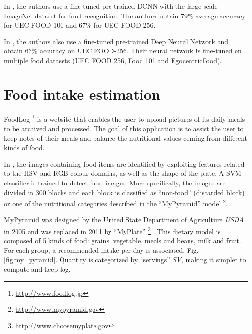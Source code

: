 
In \cite{Yanai2015}, the authors use a fine-tuned pre-trained DCNN with the large-scale ImageNet dataset for food recognition. The authors obtain 79\% average accuracy for UEC FOOD 100 and 67\% for UEC FOOD-256.

In \cite{Bolanos2016}, the authors also use a fine-tuned pre-trained Deep Neural Network and obtain 63\% accuracy on UEC FOOD-256. Their neural network is fine-tuned on multiple food datasets (UEC FOOD 256, Food 101 and EgocentricFood).

\section{Food intake estimation}


FoodLog \footnote{\url{http://www.foodlog.jp}} is a website that enables the user to upload pictures of its daily meals to be archived and processed. The goal of this application is to assist the user to keep notes of their meals and balance the nutritional values coming from different kinds of food.

In \cite{Kitamura2008}, the images containing food items are identified by exploiting features related to the HSV and RGB colour domains, as well as the shape of the plate. A SVM classifier is trained to detect food images. More specifically, the images are divided in 300 blocks and each block is classified as \enquote{non-food} (discarded block) or one of the nutritional categories described in the \enquote{MyPyramid} model \footnote{\url{http://www.mypyramid.gov}}.

MyPyramid \cite{MyPyramid} was designed by the United State Department of Agriculture \textit{USDA} in 2005 and was replaced in 2011 by \enquote{MyPlate} \footnote{\url{http://www.choosemyplate.gov}} \cite{MyPlate}. This dietary model is composed of 5 kinds of food: grains, vegetable, meals and beans, milk and fruit. For each group, a recommended intake per day is associated, Fig. \ref{fig:my_pyramid}. Quantity is categorized by \enquote{servings} \textit{SV}, making it simpler to compute and keep log.

